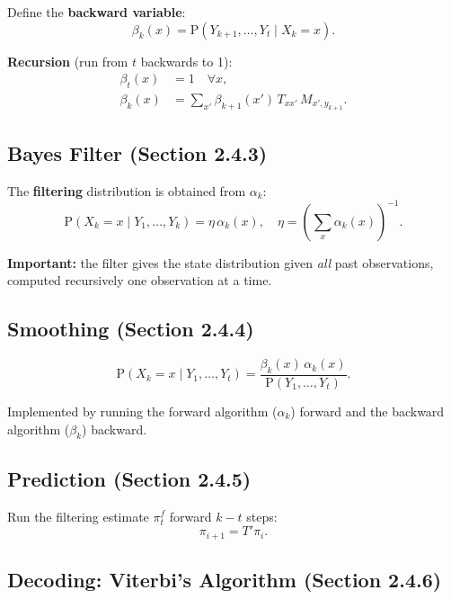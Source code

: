 \documentclass[12pt, a4paper]{article}
\begin{document}
Define the \textbf{backward variable}:
\begin{equation}
  \beta_k(x) = \mathrm{P}(Y_{k+1},\ldots,Y_t\mid X_k=x).
\end{equation}

\textbf{Recursion} (run from $t$ backwards to 1):
\begin{align}
  \beta_t(x) &= 1 \quad\forall x, \\
  \beta_k(x) &= \sum_{x'}\beta_{k+1}(x')\,T_{xx'}\,M_{x',y_{k+1}}.
\end{align}

\subsection{Bayes Filter (Section 2.4.3)}

The \textbf{filtering} distribution is obtained from $\alpha_k$:
\begin{equation}
  \mathrm{P}(X_k=x\mid Y_1,\ldots,Y_k) = \eta\,\alpha_k(x), \quad
  \eta = \left(\sum_x\alpha_k(x)\right)^{-1}.
\end{equation}

\textbf{Important:} the filter gives the state distribution given
\emph{all} past observations, computed recursively one observation at a
time.

\subsection{Smoothing (Section 2.4.4)}

\begin{equation}
  \mathrm{P}(X_k=x\mid Y_1,\ldots,Y_t) = \frac{\beta_k(x)\,\alpha_k(x)}{\mathrm{P}(Y_1,\ldots,Y_t)}.
  \label{eq:smoothing}
\end{equation}

Implemented by running the forward algorithm ($\alpha_k$) forward and
the backward algorithm ($\beta_k$) backward.

\subsection{Prediction (Section 2.4.5)}

Run the filtering estimate $\pi_t^f$ forward $k-t$ steps:
\begin{equation}
  \pi_{i+1} = T'\pi_i.
\end{equation}

\subsection{Decoding: Viterbi's Algorithm (Section 2.4.6)}
\end{document}
